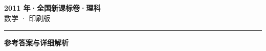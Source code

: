 \documentclass[zihao=5, a4paper]{ctexart}
\begin{document}
\begin{center}
  {\Large\bfseries 2011 年·全国新课标卷·理科}\\[4pt]
  {\large 数学 · 印刷版}
\end{center}
\medskip
{}

\par\bigskip\hrule\bigskip
{}
\begin{center}{\large\bfseries 参考答案与详细解析}\end{center}
\smallskip

\end{document}
